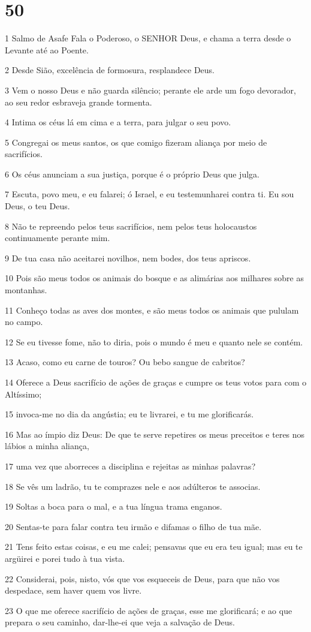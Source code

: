 \chapter{50}

\par 1 Salmo de Asafe Fala o Poderoso, o SENHOR Deus, e chama a terra desde o Levante até ao Poente.
\par 2 Desde Sião, excelência de formosura, resplandece Deus.
\par 3 Vem o nosso Deus e não guarda silêncio; perante ele arde um fogo devorador, ao seu redor esbraveja grande tormenta.
\par 4 Intima os céus lá em cima e a terra, para julgar o seu povo.
\par 5 Congregai os meus santos, os que comigo fizeram aliança por meio de sacrifícios.
\par 6 Os céus anunciam a sua justiça, porque é o próprio Deus que julga.
\par 7 Escuta, povo meu, e eu falarei; ó Israel, e eu testemunharei contra ti. Eu sou Deus, o teu Deus.
\par 8 Não te repreendo pelos teus sacrifícios, nem pelos teus holocaustos continuamente perante mim.
\par 9 De tua casa não aceitarei novilhos, nem bodes, dos teus apriscos.
\par 10 Pois são meus todos os animais do bosque e as alimárias aos milhares sobre as montanhas.
\par 11 Conheço todas as aves dos montes, e são meus todos os animais que pululam no campo.
\par 12 Se eu tivesse fome, não to diria, pois o mundo é meu e quanto nele se contém.
\par 13 Acaso, como eu carne de touros? Ou bebo sangue de cabritos?
\par 14 Oferece a Deus sacrifício de ações de graças e cumpre os teus votos para com o Altíssimo;
\par 15 invoca-me no dia da angústia; eu te livrarei, e tu me glorificarás.
\par 16 Mas ao ímpio diz Deus: De que te serve repetires os meus preceitos e teres nos lábios a minha aliança,
\par 17 uma vez que aborreces a disciplina e rejeitas as minhas palavras?
\par 18 Se vês um ladrão, tu te comprazes nele e aos adúlteros te associas.
\par 19 Soltas a boca para o mal, e a tua língua trama enganos.
\par 20 Sentas-te para falar contra teu irmão e difamas o filho de tua mãe.
\par 21 Tens feito estas coisas, e eu me calei; pensavas que eu era teu igual; mas eu te argüirei e porei tudo à tua vista.
\par 22 Considerai, pois, nisto, vós que vos esqueceis de Deus, para que não vos despedace, sem haver quem vos livre.
\par 23 O que me oferece sacrifício de ações de graças, esse me glorificará; e ao que prepara o seu caminho, dar-lhe-ei que veja a salvação de Deus.

